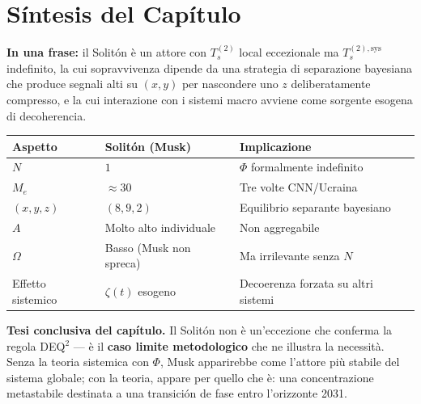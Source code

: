 \section{Síntesis del Capítulo}\label{sintesi-del-capítulo}

\Proved{} \textbf{In una frase:} il Solitón è un attore con
\(T_s^{(2)}\) local eccezionale ma \(T_s^{(2),\text{sys}}\) indefinito,
la cui sopravvivenza dipende da una strategia di separazione bayesiana
che produce segnali alti su \((x, y)\) per nascondere uno \(z\)
deliberatamente compresso, e la cui interazione con i sistemi macro
avviene come sorgente esogena di decoherencia.

{\def\LTcaptype{none} %
{\small\begin{longtable}[]{@{}
  >{\raggedright\arraybackslash}p{}
  >{\raggedright\arraybackslash}p{}
  >{\raggedright\arraybackslash}p{}@{}}
\toprule\noalign{}
\begin{minipage}[b]{\linewidth}\raggedright
Aspetto
\end{minipage} & \begin{minipage}[b]{\linewidth}\raggedright
Solitón (Musk)
\end{minipage} & \begin{minipage}[b]{\linewidth}\raggedright
Implicazione
\end{minipage} \\
\midrule\noalign{}
\endhead
\bottomrule\noalign{}
\endlastfoot
\(N\) & \(1\) & \(\Phi\) formalmente indefinito \\
\(M_e\) & \(\approx 30\) & Tre volte CNN/Ucraina \\
\((x, y, z)\) & \((8, 9, 2)\) & Equilibrio separante bayesiano \\
\(A\) & Molto alto individuale & Non aggregabile \\
\(\Omega\) & Basso (Musk non spreca) & Ma irrilevante senza \(N\) \\
Effetto sistemico & \(\zeta(t)\) esogeno & Decoerenza forzata su altri
sistemi \\
\end{longtable}}
}

\Hypoth{} \textbf{Tesi conclusiva del capítulo.} Il Solitón non è
un'eccezione che conferma la regola DEQ$^2$ --- è il \textbf{caso limite
metodologico} che ne illustra la necessità. Senza la teoria sistemica
con \(\Phi\), Musk apparirebbe come l'attore più stabile del sistema
globale; con la teoria, appare per quello che è: una concentrazione
metastabile destinata a una transición de fase entro l'orizzonte 2031.



